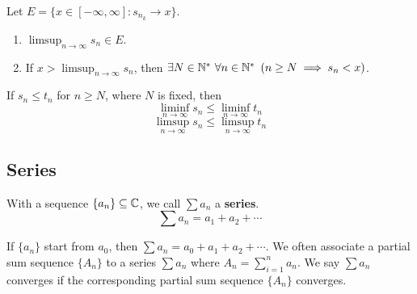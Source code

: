     \begin{theo}
        Let $E = \{ x \in [-\infty, \infty] : s_{n_k} \to x \}$. 
        \begin{enumerate}
            \item $\limsup_{n \to \infty} s_n \in E$.
            \item If $x > \limsup_{n \to \infty} s_n$, then $\exists N \in \mathbb{N}^* \ \forall n \in \mathbb{N}^* \ \left( n \geq N \implies s_n < x \right)$.
        \end{enumerate}
    \end{theo}

    \begin{theo}
        If $s_n \leq t_n$ for $n \geq N$, where $N$ is fixed, then
        \begin{equation}
            \liminf_{n \to \infty} s_n \leq \liminf_{n \to \infty} t_n
        \end{equation}
        \begin{equation}
            \limsup_{n \to \infty} s_n \leq \limsup_{n \to \infty} t_n
        \end{equation}
    \end{theo}

    \subsection{Series}
    \begin{defi}
        With a sequence $\{ a_n \} \subseteq \mathbb{C}$, we call $\sum a_n$ a \textbf{series}.
        \begin{equation}
            \sum a_n = a_1 + a_2 + \cdots
        \end{equation}
    \end{defi}

    \begin{rem}
        If $\{ a_n \}$ start from $a_0$, then $\sum a_n = a_0 + a_1 + a_2 + \cdots$. We often associate a partial sum sequence $\{A_n\}$ to a series $\sum a_n$ where $A_n = \sum_{i=1}^n a_n$. We say $\sum a_n$ converges if the corresponding partial sum sequence $\{A_n\}$ converges.
    \end{rem}

